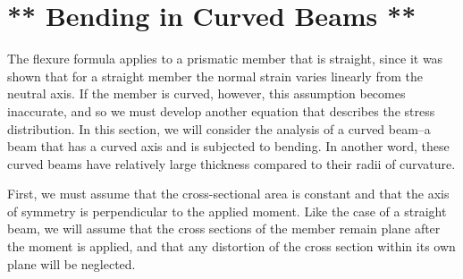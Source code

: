 \documentclass[
fontsize=10pt,
a4paper,
twosides=false,
open=any,
svgnames,
]{kaobook} %
\begin{document}
\section{** Bending in Curved Beams **}
                
The flexure formula applies to a prismatic member that is straight, since it was shown that for a straight member the normal strain varies linearly from the neutral axis. If the member is curved, however, this assumption becomes inaccurate, and so we must develop another equation that describes the stress distribution. In this section, we will consider the analysis of a curved beam--a beam that has a curved axis and is subjected to bending. In another word, these curved beams have relatively large thickness compared to their radii of curvature.

First, we must assume that the cross-sectional area is constant and that the axis of symmetry is perpendicular to the applied moment. Like the case of a straight beam, we will assume that the cross sections of the member remain plane after the moment is applied, and that any distortion of the cross section within its own plane will be neglected.
\end{document}
